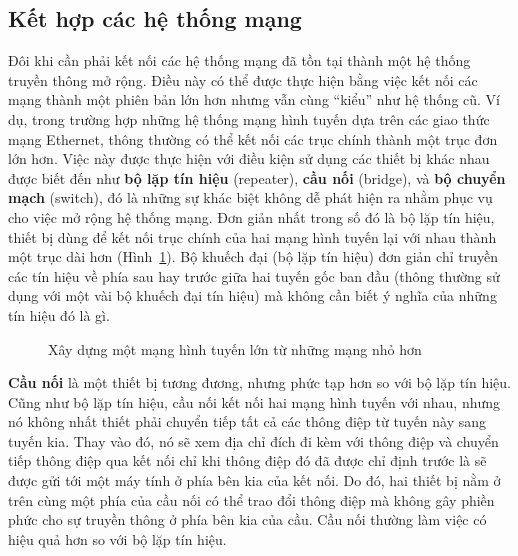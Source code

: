 \subsection*{Kết hợp các hệ thống mạng}

Đôi khi cần phải kết nối các hệ thống mạng đã tồn tại thành một hệ thống truyền thông mở
rộng. Điều này có thể được thực hiện bằng việc kết nối các mạng thành một phiên bản lớn
hơn nhưng vẫn cùng ``kiểu'' như hệ thống cũ. Ví dụ, trong trường hợp những hệ thống mạng
hình tuyến dựa trên các giao thức mạng Ethernet, thông thường có thể kết nối các trục
chính thành một trục đơn lớn hơn. Việc này được thực hiện với điều kiện sử dụng các thiết
bị khác nhau được biết đến như\textbf{ bộ lặp tín hiệu} (repeater), \textbf{cầu nối}
(bridge), và \textbf{bộ chuyển mạch} (switch), đó là những sự khác biệt không dễ phát hiện
ra nhằm phục vụ cho việc mở rộng hệ thống mạng. Đơn giản nhất trong số đó là bộ lặp tín
hiệu, thiết bị dùng để kết nối trục chính của hai mạng hình tuyến lại với nhau thành một
trục dài hơn (Hình~\ref{fig:fig4.4}). Bộ khuếch đại (bộ lặp tín hiệu) đơn giản chỉ truyền
các tín hiệu về phía sau hay trước giữa hai tuyến gốc ban đầu (thông thường sử dụng với
một vài bộ khuếch đại tín hiệu) mà không cần biết ý nghĩa của những tín hiệu đó là gì.

\begin{figure}[tb] 
  \centering {}
  \caption{Xây dựng một mạng hình tuyến lớn từ những mạng nhỏ hơn}
  \label{fig:fig4.4}
\end{figure}

\textbf{Cầu nối} là một thiết bị tương đương, nhưng phức tạp hơn so với bộ lặp tín
hiệu. Cũng như bộ lặp tín hiệu, cầu nối kết nối hai mạng hình tuyến với nhau, nhưng nó
không nhất thiết phải chuyển tiếp tất cả các thông điệp từ tuyến này sang tuyến kia. Thay
vào đó, nó sẽ xem địa chỉ đích đi kèm với thông điệp và chuyển tiếp thông điệp qua kết nối
chỉ khi thông điệp đó đã được chỉ định trước là sẽ được gửi tới một máy tính ở phía bên
kia của kết nối. Do đó, hai thiết bị nằm ở trên cùng một phía của cầu nối có thể trao đổi
thông điệp mà không gây phiền phức cho sự truyền thông ở phía bên kia của cầu. Cầu nối
thường làm việc có hiệu quả hơn so với bộ lặp tín hiệu.

